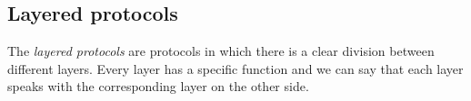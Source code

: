 \subsection{Layered protocols}
The \textit{layered protocols} are protocols in which there is a clear division between different layers. Every layer has a specific function and we can say that each layer speaks with the corresponding layer on the other side.